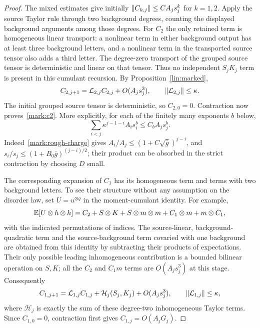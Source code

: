 \begin{proof}
The mixed estimates give initially
$\left\lVert C_{k,j}\right\rVert\le CA_js_j^k$ for $k=1,2$.
Apply the source Taylor rule through two background degrees, counting
the displayed background arguments among those degrees.  For $C_2$
the only retained term is homogeneous linear transport: a nonlinear
term in either background output has at least three background
letters, and a nonlinear term in the transported source tensor also
adds a third letter.  The degree-zero transport of the grouped source
tensor is deterministic and linear on that tensor.  Thus no independent
$S_jK_j$ term is present in this cumulant recursion.  By
Proposition~\ref{lin:marked},
\begin{equation}\label{mark:c2-recur}
 C_{2,j+1}=\mathcal L_{2,j}C_{2,j}+O(A_js_j^3),
 \qquad \left\lVert\mathcal L_{2,j}\right\rVert\le\kappa.
\end{equation}
The initial grouped source tensor is deterministic, so $C_{2,0}=0$.
Contraction now proves~\eqref{mark:c2}.  More explicitly, for each of the
finitely many exponents $b$ below,
\begin{equation}\label{mark:varying-convolution}
 \sum_{i<j}\kappa^{j-1-i}A_i s_i^b\le C_b A_j s_j^b.
\end{equation}
Indeed~\eqref{mark:rough-charge} gives
$A_i/A_j\le(1+C\sqrt{\bar g})^{j-i}$, and
$s_i/s_j\le(1+B_0\bar g)^{(j-i)/2}$; their product can be absorbed
in the strict contraction by choosing $D$ small.

The corresponding expansion of $C_1$ has its homogeneous term and
terms with two background letters.  To see their structure without
any assumption on the disorder law, set $U=u^{\otimes q}$ in the
moment-cumulant identity.  For example,
\[
 \mathbb E[U\otimes h\otimes h]
 =C_2+S\otimes K+S\otimes m\otimes m
       +C_1\otimes m+m\otimes C_1,
\]
with the indicated permutations of indices.  The source-linear,
background-quadratic term and the source-background term covaried with
one background are obtained from this identity by subtracting their
products of expectations.  Their only possible leading inhomogeneous
contribution is a bounded bilinear operation on $S,K$; all the
$C_2$ and $C_1m$ terms are $O(A_js_j^3)$ at this stage.
Consequently
\begin{equation}\label{mark:c1-recur}
 C_{1,j+1}=\mathcal L_{1,j}C_{1,j}
       +\mathcal H_j(S_j,K_j)+O(A_js_j^3),
 \qquad\left\lVert\mathcal L_{1,j}\right\rVert\le\kappa,
\end{equation}
where $\mathcal H_j$ is exactly the sum of these degree-two
inhomogeneous Taylor terms.  Since $C_{1,0}=0$, contraction first gives
$C_{1,j}=O(A_jG_j)$.


\end{proof}
